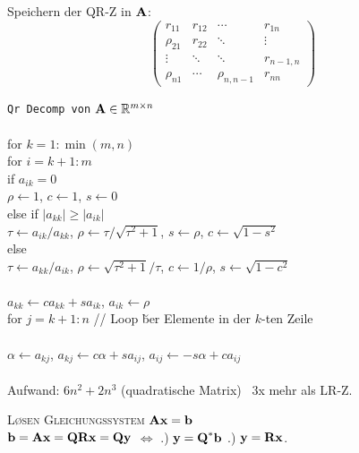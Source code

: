 Speichern der QR-Z in $\mbox{\bf A}$:
\begin{equation}
\begin{pmatrix}
r_{11} & r_{12} & \cdots    & r_{1n} \\
\rho_{21} & r_{22} & \ddots    & \vdots \\
\vdots & \ddots & \ddots    & r_{n-1,n} \\
\rho_{n1} & \cdots & \rho_{n,n-1} & r_{nn} 
\end{pmatrix}
\end{equation}

\verb!Qr Decomp von! $\mbox{\bf A} \in \mathbb{R}^{m \times n}$\\
{\addtolength{\leftskip}{0mm}
\hrulefill\\
for $k=1:\min(m,n)$ \\
\quad for $i=k+1:m$ \\
\qquad if $a_{ik}=0$\\
\qquad\quad $\rho \leftarrow 1$, $c \leftarrow 1$, $s \leftarrow 0$ \\
\qquad else if $|a_{kk}|\geq|a_{ik}|$ \\
\qquad\quad $\tau \leftarrow a_{ik}/a_{kk}$, $\rho \leftarrow \tau/\sqrt{\tau^2+1}$, $s \leftarrow \rho$, $c\leftarrow \sqrt{1-s^2}$ \\
\qquad else \qquad\qquad\qquad\quad{} \\
\qquad\quad $\tau \leftarrow a_{kk}/a_{ik}$, $\rho \leftarrow \sqrt{\tau^2+1}/\tau$, $c \leftarrow 1/\rho$, $s\leftarrow \sqrt{1-c^2}$ \\
\\ 
\qquad $a_{kk} \leftarrow ca_{kk}+sa_{ik}$, $a_{ik}\leftarrow \rho$\\
\qquad for $j=k+1:n$ {\scriptsize // Loop \u ber Elemente in der $k$-ten Zeile}\\
\qquad {} \\
\qquad \quad $\alpha \leftarrow a_{kj}$, $a_{kj} \leftarrow c\alpha+sa_{ij}$, $a_{ij} \leftarrow -s\alpha + ca_{ij}$ \\
\hrulefill\\
}
Aufwand: $6n^2+2n^3$ (quadratische Matrix) ~3x mehr als LR-Z. \vspace{0.2cm}

\textsc{L\o sen Gleichungssystem $\mbox{\bf Ax}=\mbox{\bf b}$}\\
$\mbox{\bf b}=\mbox{\bf Ax}=\mbox{\bf QRx}=\mbox{\bf Qy}$ \quad $\Leftrightarrow$ .) $\mbox{\bf y}=\mbox{\bf Q}^*\mbox{\bf b}$ .) $\mbox{\bf y}=\mbox{\bf Rx}$.

